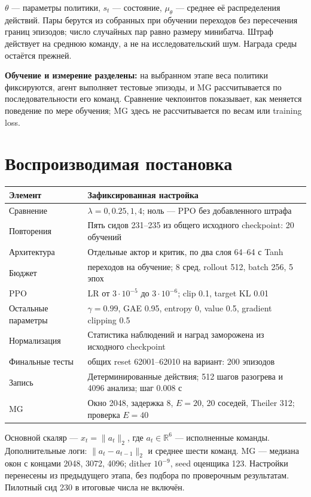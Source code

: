 \documentclass[10pt,a4paper]{article}
\begin{document}
$\theta$ --- параметры политики, $s_t$ --- состояние, $\mu_\theta$ --- среднее её распределения действий. Пары берутся из собранных при обучении переходов без пересечения границ эпизодов; число случайных пар равно размеру минибатча. Штраф действует на среднюю команду, а не на исследовательский шум. Награда среды остаётся прежней.

\textbf{Обучение и измерение разделены:} на выбранном этапе веса политики фиксируются, агент выполняет тестовые эпизоды, и MG рассчитывается по последовательности его команд. Сравнение чекпоинтов показывает, как меняется поведение по мере обучения; MG здесь не рассчитывается по весам или training loss.

\section*{Воспроизводимая постановка}

\begin{center}\small
\begin{tabularx}{\linewidth}{l>{\raggedright\arraybackslash}X}
\toprule
Элемент & Зафиксированная настройка \\
\midrule
Сравнение & $\lambda=0,0.25,1,4$; ноль --- PPO без добавленного штрафа \\
Повторения & Пять сидов 231--235 из общего исходного checkpoint: 20 обучений \\
Архитектура & Отдельные актор и критик, по два слоя 64--64 с Tanh \\
Бюджет & 1048576 переходов на обучение; 8 сред, rollout 512, batch 256, 5 эпох \\
PPO & LR от $3\cdot10^{-5}$ до $3\cdot10^{-6}$; clip 0.1, target KL 0.01 \\
Остальные параметры & $\gamma=0.99$, GAE 0.95, entropy 0, value 0.5, gradient clipping 0.5 \\
Нормализация & Статистика наблюдений и наград заморожена из исходного checkpoint \\
Финальные тесты & 10 общих reset 62001--62010 на вариант: 200 эпизодов \\
Запись & Детерминированные действия; 512 шагов разогрева и 4096 анализа; шаг 0.008 с \\
MG & Окно 2048, задержка 8, $E=20$, 20 соседей, Theiler 312; проверка $E=40$ \\
\bottomrule\end{tabularx}\end{center}

Основной скаляр --- $x_t=\|a_t\|_2$, где $a_t\in\mathbb R^6$ --- исполненные команды. Дополнительные логи: $\|a_t-a_{t-1}\|_2$ и среднее шести команд. MG --- медиана окон с концами 2048, 3072, 4096; dither $10^{-9}$, seed оценщика 123. Настройки перенесены из предыдущего этапа, без подбора по проверочным результатам. Пилотный сид 230 в итоговые числа не включён.
\end{document}
